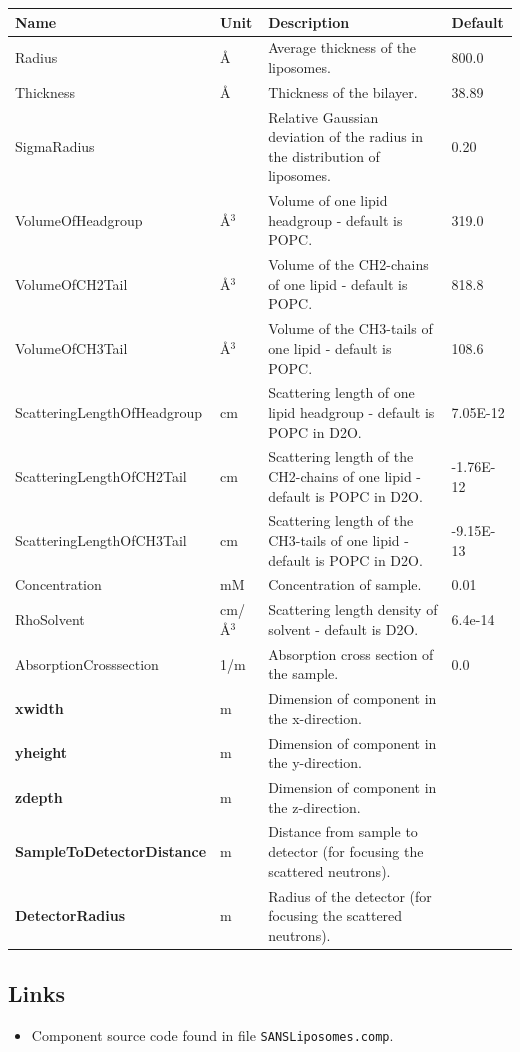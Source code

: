\begin{longtable}{p{}p{}p{}p{}}
\toprule
\textbf{Name} & \textbf{Unit} & \textbf{Description} & \textbf{Default} \\
\midrule
\endhead
Radius & \AA{} & Average thickness of the liposomes. & 800.0 \\
Thickness & \AA{} & Thickness of the bilayer. & 38.89 \\
SigmaRadius &  & Relative Gaussian deviation of the radius in the distribution of liposomes. & 0.20 \\
VolumeOfHeadgroup & \AA{}$^{3}$ & Volume of one lipid headgroup - default is POPC. & 319.0 \\
VolumeOfCH2Tail & \AA{}$^{3}$ & Volume of the CH2-chains of one lipid - default is POPC. & 818.8 \\
VolumeOfCH3Tail & \AA{}$^{3}$ & Volume of the CH3-tails of one lipid - default is POPC. & 108.6 \\
ScatteringLengthOfHeadgroup & cm & Scattering length of one lipid headgroup - default is POPC in D2O. & 7.05E-12 \\
ScatteringLengthOfCH2Tail & cm & Scattering length of the CH2-chains of one lipid - default is POPC in D2O. & -1.76E-12 \\
ScatteringLengthOfCH3Tail & cm & Scattering length of the CH3-tails of one lipid - default is POPC in D2O. & -9.15E-13 \\
Concentration & mM & Concentration of sample. & 0.01 \\
RhoSolvent & cm/\AA{}$^{3}$ & Scattering length density of solvent - default is D2O. & 6.4e-14 \\
AbsorptionCrosssection & 1/m & Absorption cross section of the sample. & 0.0 \\
\textbf{xwidth} & m & Dimension of component in the x-direction. &  \\
\textbf{yheight} & m & Dimension of component in the y-direction. &  \\
\textbf{zdepth} & m & Dimension of component in the z-direction. &  \\
\textbf{SampleToDetectorDistance} & m & Distance from sample to detector (for focusing the scattered neutrons). &  \\
\textbf{DetectorRadius} & m & Radius of the detector (for focusing the scattered neutrons). &  \\
\bottomrule
\end{longtable}

\subsection*{Links}
\begin{itemize}
  \item Component source code found in file \texttt{SANSLiposomes.comp}.
\end{itemize}
